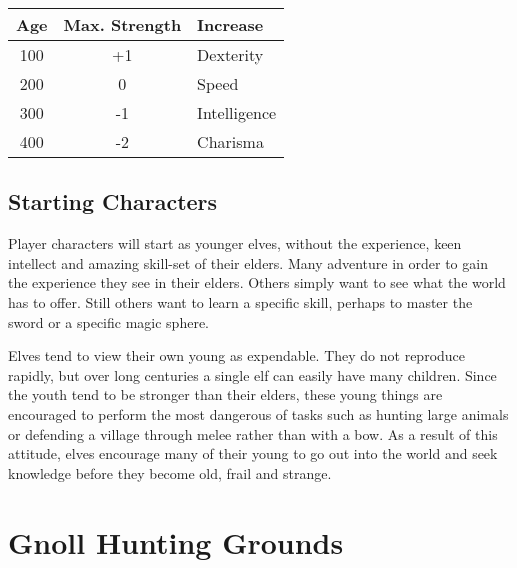 \begin{multicols}{2}
	\begin{tabular}{ccl}

		Age & Max. Strength & Increase \\\hline

		100 & +1 & Dexterity \\

		200 & 0 & Speed \\

		300 & -1 & Intelligence \\

		400 & -2 & Charisma \\

	\end{tabular}

\subsection{Starting Characters}

Player characters will start as younger elves, without the experience, keen intellect and amazing skill-set of their elders. Many adventure in order to gain the experience they see in their elders. Others simply want to see what the world has to offer. Still others want to learn a specific skill, perhaps to master the sword or a specific magic sphere.

Elves tend to view their own young as expendable. They do not reproduce rapidly, but over long centuries a single elf can easily have many children. Since the youth tend to be stronger than their elders, these young things are encouraged to perform the most dangerous of tasks such as hunting large animals or defending a village through melee rather than with a bow. As a result of this attitude, elves encourage many of their young to go out into the world and seek knowledge before they become old, frail and strange.

\end{multicols}

\section[Gnolls]{Gnoll Hunting Grounds}

